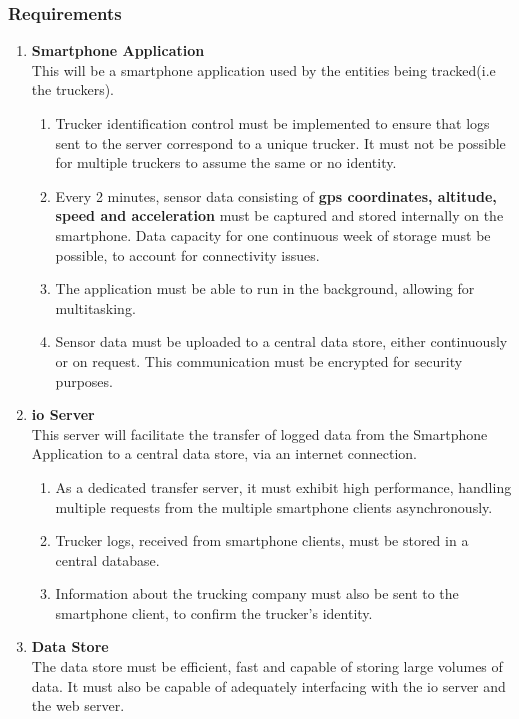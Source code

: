 \subsubsection{Requirements}
\begin{enumerate}
\item \textbf{Smartphone Application}\\
    This will be a smartphone application used by the entities being tracked(i.e the truckers).
    \begin{enumerate}
        \item Trucker identification control must be implemented to ensure that logs sent to the server correspond to a unique trucker. It must not be possible for multiple truckers to assume the same or no identity.
        \item Every 2 minutes, sensor data consisting of \textbf{\ac{gps} coordinates, altitude, speed and acceleration} must be captured and stored internally on the smartphone. 
        Data capacity for one continuous week of storage must be possible, to account for connectivity issues.
        \item The application must be able to run in the background, allowing for multitasking.
        \item Sensor data must be uploaded to a central data store, either continuously or on request. This communication must be encrypted for security purposes.
    \end{enumerate}
\item \textbf{\ac{io} Server}\\
This server will facilitate the transfer of logged data from the Smartphone Application to a central data store, via an internet connection. 
    \begin{enumerate}
        \item As a dedicated transfer server, it must exhibit high performance, handling multiple requests from the multiple smartphone clients asynchronously.
        \item Trucker logs, received from smartphone clients, must be stored in a central database.
        \item Information about the trucking company must also be sent to the smartphone client, to confirm the trucker's identity.
    \end{enumerate}

\item \textbf{Data Store}\\
The data store must be efficient, fast and capable of storing large volumes of data.
It must also be capable of adequately interfacing with the \ac{io} server and the web server.


\end{enumerate}

